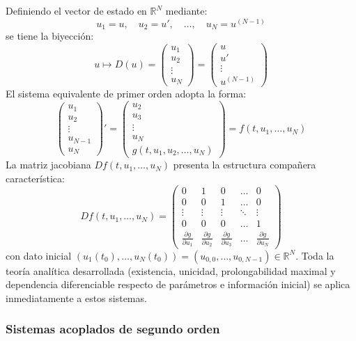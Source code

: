 Definiendo el vector de estado en $\mathbb{R}^N$ mediante:
\[
    u_1 = u, \quad u_2 = u', \quad \dots, \quad u_N = u^{(N-1)}
\]
se tiene la biyección:
\[
    u \longmapsto D(u) = \begin{pmatrix} u_1 \\ u_2 \\ \vdots \\ u_N \end{pmatrix} = \begin{pmatrix} u \\ u' \\ \vdots \\ u^{(N-1)} \end{pmatrix}
\]
El sistema equivalente de primer orden adopta la forma:
\[
    \begin{pmatrix} u_1 \\ u_2 \\ \vdots \\ u_{N-1} \\ u_N \end{pmatrix}' = \begin{pmatrix} u_2 \\ u_3 \\ \vdots \\ u_N \\ g(t, u_1, u_2, \dots, u_N) \end{pmatrix} = f(t, u_1, \dots, u_N)
\]
La matriz jacobiana $Df(t, u_1, \dots, u_N)$ presenta la estructura compañera característica:
\[
    Df(t, u_1, \dots, u_N) = \begin{pmatrix}
        0 & 1 & 0 & \dots & 0 \\
        0 & 0 & 1 & \dots & 0 \\
        \vdots & \vdots & \vdots & \ddots & \vdots \\
        0 & 0 & 0 & \dots & 1 \\
        \frac{\partial g}{\partial u_1} & \frac{\partial g}{\partial u_2} & \frac{\partial g}{\partial u_3} & \dots & \frac{\partial g}{\partial u_N}
    \end{pmatrix}
\]
con dato inicial $(u_1(t_0), \dots, u_N(t_0)) = (u_{0,0}, \dots, u_{0, N-1}) \in \mathbb{R}^N$. Toda la teoría analítica desarrollada (existencia, unicidad, prolongabilidad maximal y dependencia diferenciable respecto de parámetros e información inicial) se aplica inmediatamente a estos sistemas.

\subsubsection{Sistemas acoplados de segundo orden}

